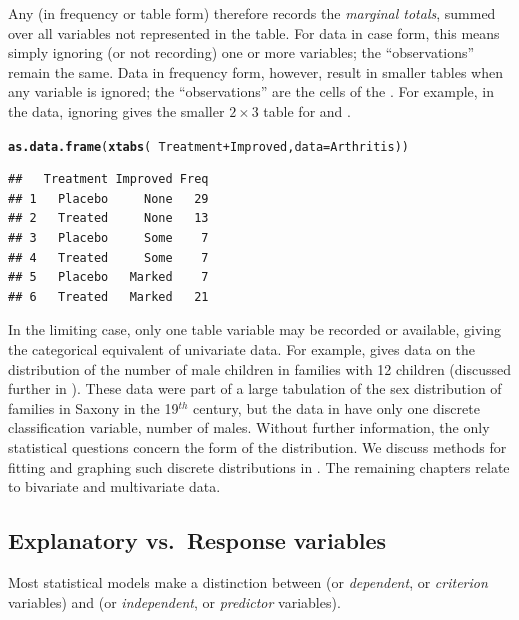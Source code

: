 \documentclass[11pt]{book}\usepackage[]{graphicx}\usepackage[]{color}
\makeatletter
\newcommand{\hlopt}[1]{\textcolor[rgb]{0,0,0}{#1}}%
\newcommand{\hlstd}[1]{\textcolor[rgb]{0.345,0.345,0.345}{#1}}%
\newcommand{\hlkwc}[1]{\textcolor[rgb]{0.333,0.667,0.333}{#1}}%
\newcommand{\hlkwd}[1]{\textcolor[rgb]{0.737,0.353,0.396}{\textbf{#1}}}%
\newenvironment{kframe}{%
 \def\at@end@of@kframe{}%
 \ifinner\ifhmode%
  \def\at@end@of@kframe{\end{minipage}}%
  \begin{minipage}{\columnwidth}%
 \fi\fi%
 \def\FrameCommand##1{\hskip\@totalleftmargin \hskip-\fboxsep
 \colorbox{shadecolor}{##1}\hskip-\fboxsep
     \hskip-\linewidth \hskip-\@totalleftmargin \hskip\columnwidth}%
 \MakeFramed {\advance\hsize-\width
   \@totalleftmargin\z@ \linewidth\hsize
   \@setminipage}}%
 {\par\unskip\endMakeFramed%
 \at@end@of@kframe}
\newenvironment{knitrout}{}{} %
\renewenvironment{knitrout}{\small\renewcommand{\baselinestretch}{.85}}{} %
\makeatother
\begin{document}
Any \ctab (in frequency or table form) therefore records the \emph{marginal totals}, summed over all
variables not represented in the table.
For data in case form, this means simply ignoring (or not recording)
one or more variables;  the ``observations'' remain the same.
Data in frequency form, however, result in smaller tables when
any variable is ignored;  the ``observations'' are the cells of
the \ctab. For example, in the  data, ignoring 
gives the smaller $2 \times 3$ table for  and .
\begin{knitrout}
\color{fgcolor}\begin{kframe}
\begin{alltt}
\hlkwd{as.data.frame}\hlstd{(}\hlkwd{xtabs}\hlstd{(}\hlopt{~}\hlstd{Treatment} \hlopt{+} \hlstd{Improved,} \hlkwc{data}\hlstd{=Arthritis))}
\end{alltt}
\begin{verbatim}
##   Treatment Improved Freq
## 1   Placebo     None   29
## 2   Treated     None   13
## 3   Placebo     Some    7
## 4   Treated     Some    7
## 5   Placebo   Marked    7
## 6   Treated   Marked   21
\end{verbatim}
\end{kframe}
\end{knitrout}



In the limiting case, only one table variable may be recorded or
available, giving the categorical equivalent of univariate data.
For example,  gives data on the distribution
of the number of male children in families with 12 children
(discussed further in ).
These data were part of a large tabulation of the sex distribution
of families in Saxony in the 19$^{th}$ century, but the data in 
have only one discrete classification variable, number of males.
Without further information, the only statistical questions concern
the form of the distribution.
We discuss methods for fitting and graphing such discrete distributions
in .
The remaining chapters relate to bivariate and multivariate data.


\subsection{Explanatory vs.\ Response variables}\label{sec:exp-resp}
Most statistical models make a distinction between 
(or \emph{dependent}, or \emph{criterion} variables)
and
(or \emph{independent}, or \emph{predictor} variables).
\end{document}
